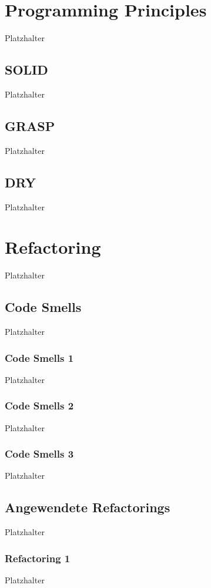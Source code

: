 \documentclass[12pt]{article}
\begin{document}
\newpage

\section{Programming Principles}
Platzhalter

\subsection{SOLID}
Platzhalter

\subsection{GRASP}
Platzhalter

\subsection{DRY}
Platzhalter

\newpage

\section{Refactoring}
Platzhalter

\subsection{Code Smells}
Platzhalter

\subsubsection{Code Smells 1}
Platzhalter
\subsubsection{Code Smells 2}
Platzhalter
\subsubsection{Code Smells 3}
Platzhalter

\subsection{Angewendete Refactorings}
Platzhalter

\subsubsection{Refactoring 1}
Platzhalter
\end{document}
